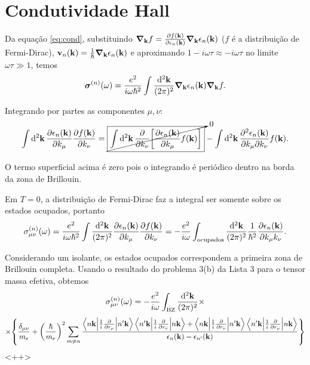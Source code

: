 \documentclass[a4paper,10pt]{article}
\begin{document}
\pagebreak

\section{Condutividade Hall}

Da equação \ref{eq:cond}, substituindo $\grad_{\vb{k}}f = \pdv{f(\vb{k})}{\epsilon_n(\vb{k})} \grad_{\vb{k}}\epsilon_n(\vb{k})$ ($f$ é a distribuição de Fermi-Dirac), $\vb{v}_n(\vb{k}) = \frac{1}{\hbar} \grad_{\vb{k}}\epsilon_n(\vb{k})$ e aproximando $1-i\omega\tau \approx -i\omega\tau$ no limite $\omega\tau \gg 1$, temos
$$
\bm{\sigma}^{(n)}(\omega) = \frac{e^2}{i\omega \hbar^2}
\int \frac{\dd[2]{\vb{k}}}{(2\pi)^2} \grad_{\vb{k}}\epsilon_n(\vb{k}) \grad_{\vb{k}} f.
$$

 Integrando por partes as componentes $\mu, \nu$:
$$
\int \dd[2]{\vb{k}} \pdv{\epsilon_n(\vb{k})}{k_\mu} \pdv{f(\vb{k})}{k_\nu} =
\cancelto{0}{\boxed{\int \dd[2]{\vb{k}} \pdv{k_\nu} \qty[\pdv{\epsilon_n(\vb{k})}{k_\mu} f(\vb{k})]}} -
\int \dd[2]{\vb{k}} \pdv{\epsilon_n(\vb{k})}{k_\mu}{k_\nu} f(\vb{k}).
$$

O termo superficial acima é zero pois o integrando é periódico dentro na borda da zona de Brillouin.

Em $T=0$, a distribuição de Fermi-Dirac faz a integral ser somente sobre os estados ocupados, portanto
$$
\sigma^{(n)}_{\mu\nu}(\omega) = \frac{e^2}{i\omega \hbar^2}
\int \frac{\dd[2]{\vb{k}}}{(2\pi)^2} \pdv{\epsilon_n(\vb{k})}{k_\mu} \pdv{f(\vb{k})}{k_\nu} =
- \frac{e^2}{i\omega}
\int_{\text{ocupados}} \frac{\dd[2]{\vb{k}}}{(2\pi)^2} \frac{1}{\hbar^2} \pdv{\epsilon_n(\vb{k})}{k_\mu k_\nu}.
$$

Considerando um isolante, os estados ocupados correspondem a primeira zona de Brillouin completa. Usando o resultado do problema 3(b) da Lista 3 para o tensor massa efetiva, obtemos
$$
\sigma^{(n)}_{\mu\nu}(\omega) = -\frac{e^2}{i\omega} \int_{\text{BZ}} \frac{\dd[2]{\vb{k}}}{(2\pi)^2} \times
$$
$$
\times \qty{
\frac{\delta_{\mu\nu}}{m_e} +
\qty(\frac{\hbar}{m_e})^2
\sum_{m\neq n}
\frac{
\mel**{n\vb{k}}{\frac{1}{i}\pdv{r_\mu}}{n'\vb{k}} \mel**{n'\vb{k}}{\frac{1}{i}\pdv{r_\nu}}{n\vb{k}} +
\mel**{n\vb{k}}{\frac{1}{i}\pdv{r_\nu}}{n'\vb{k}} \mel**{n'\vb{k}}{\frac{1}{i}\pdv{r_\mu}}{n\vb{k}}
}{\epsilon_n(\vb{k}) - \epsilon_{n'}(\vb{k})}
}
$$
<++>
\end{document}
